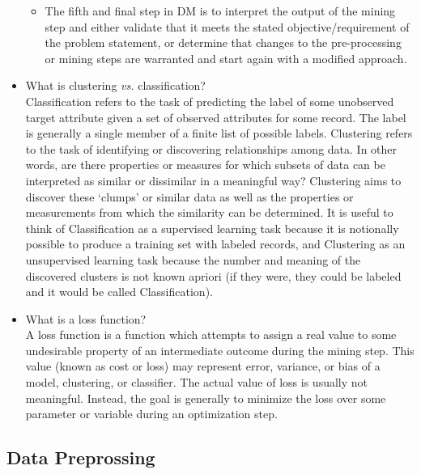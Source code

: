 \documentclass[fleqn,10pt]{SelfArx} %
\begin{document}
\begin{itemize}[noitemsep]
\begin{itemize}
	\item The fifth and final step in DM is to interpret the output of the mining step and either validate that it meets the stated objective/requirement of the problem statement, or determine that changes to the pre-processing or mining steps are warranted and start again with a modified approach.

\end{itemize}

\item What is clustering \textit{vs.} classification?\\
  Classification refers to the task of predicting the label of some unobserved target attribute given a set of observed attributes for some record.  The label is generally a single member of a finite list of possible labels.  Clustering refers to the task of identifying or discovering relationships among data.  In other words, are there properties or measures for which subsets of data can be interpreted as similar or dissimilar in a meaningful way?  Clustering aims to discover these `clumps' or similar data as well as the properties or measurements from which the similarity can be determined.  It is useful to think of Classification as a supervised learning task because it is notionally possible to produce a training set with labeled records, and Clustering as an unsupervised learning task because the number and meaning of the discovered clusters is not known apriori (if they were, they could be labeled and it would be called Classification).

\item What is a loss function?\\
 A loss function is a function which attempts to assign a real value to some undesirable property of an intermediate outcome during the mining step.  This value (known as cost or loss) may represent error, variance, or bias of a model, clustering, or classifier.  The actual value of loss is usually not meaningful.  Instead, the goal is generally to minimize the loss over some parameter or variable during an optimization step.

\end{itemize}


\subsection{Data Preprossing}
\end{document}
